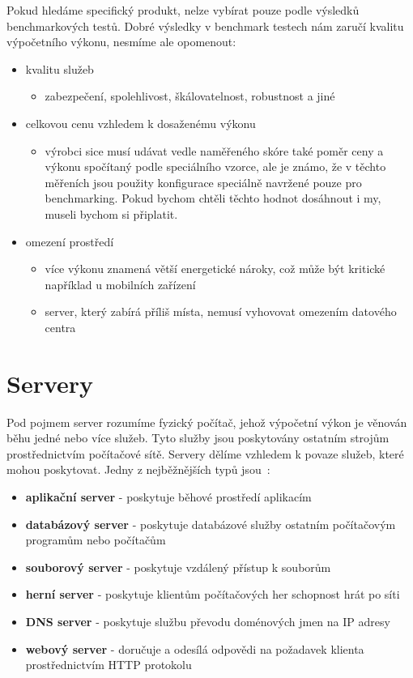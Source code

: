 \documentclass[122pt,oneside]{fithesis}
\begin{document}
Pokud hledáme specifický produkt, nelze vybírat pouze podle výsledků benchmarkových testů. Dobré výsledky v benchmark testech nám zaručí kvalitu výpočetního výkonu, nesmíme ale opomenout:

\begin{itemize}
  \item kvalitu služeb
  \begin{itemize}
    \item zabezpečení, spolehlivost, škálovatelnost, robustnost a jiné
  \end{itemize}
  \item celkovou cenu vzhledem k dosaženému výkonu 
  \begin{itemize}
    \item  výrobci sice musí udávat vedle naměřeného skóre také poměr ceny a výkonu spočítaný podle speciálního vzorce, ale je známo, že v těchto měřeních jsou použity konfigurace speciálně navržené pouze pro benchmarking. Pokud bychom chtěli těchto hodnot dosáhnout i my, museli bychom si připlatit.
  \end{itemize}
  \item omezení prostředí
  \begin{itemize}
    \item více výkonu znamená větší energetické nároky, což může být kritické například u mobilních zařízení
    \item server, který zabírá příliš místa, nemusí vyhovovat omezením datového centra
  \end{itemize}
\end{itemize}

\section{Servery}

Pod pojmem server rozumíme fyzický počítač, jehož výpočetní výkon je věnován běhu jedné nebo více služeb. Tyto služby jsou poskytovány ostatním strojům prostřednictvím počítačové sítě. Servery dělíme vzhledem k povaze služeb, které mohou poskytovat. Jedny z nejběžnějších typů jsou~\cite{wikiServerComp}:
\begin{itemize}
  \item {\bf aplikační server} - poskytuje běhové prostředí aplikacím
  \item {\bf databázový server} - poskytuje databázové služby ostatním počítačovým programům nebo počítačům
  \item {\bf souborový server} - poskytuje vzdálený přístup k souborům
  \item {\bf herní server} - poskytuje klientům počítačových her schopnost hrát po síti
  \item {\bf DNS server} - poskytuje službu převodu doménových jmen na IP adresy
  \item {\bf webový server} - doručuje a odesílá odpovědi na požadavek klienta prostřednictvím HTTP protokolu
\end{itemize}
\end{document}
